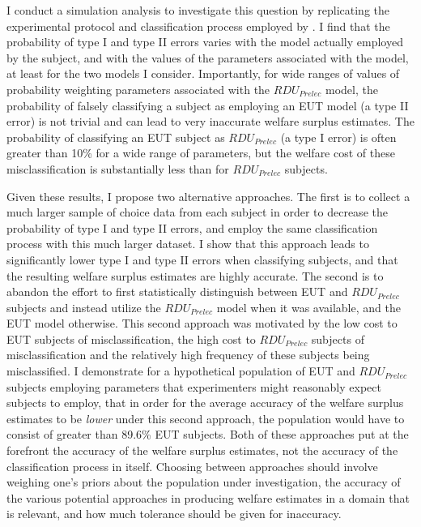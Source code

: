 \documentclass[../main.tex]{subfiles}
\begin{document}
I conduct a simulation analysis to investigate this question by replicating the experimental protocol and classification process employed by \textcite{Harrison2016}.
I find that the probability of type I and type II errors varies with the model actually employed by the subject, and with the values of the parameters associated with the model, at least for the two models I consider.
Importantly, for wide ranges of values of probability weighting parameters associated with the $\mathit{RDU_{Prelec}}$ model, the probability of falsely classifying a subject as employing an EUT model (a type II error) is not trivial and can lead to very inaccurate welfare surplus estimates.
The probability of classifying an EUT subject as $\mathit{RDU_{Prelec}}$ (a type I error) is often greater than 10\% for a wide range of parameters, but the welfare cost of these misclassification is substantially less than for $\mathit{RDU_{Prelec}}$ subjects.

Given these results, I propose two alternative approaches.
The first is to collect a much larger sample of choice data from each subject in order to decrease the probability of type I and type II errors, and employ the same classification process with this much larger dataset.
I show that this approach leads to significantly lower type I and type II errors when classifying subjects, and that the resulting welfare surplus estimates are highly accurate.
The second is to abandon the effort to first statistically distinguish between EUT and $\mathit{RDU_{Prelec}}$ subjects and instead utilize the $\mathit{RDU_{Prelec}}$ model when it was available, and the EUT model otherwise.
This second approach was motivated by the low cost to EUT subjects of misclassification, the high cost to $\mathit{RDU_{Prelec}}$ subjects of misclassification and the relatively high frequency of these subjects being misclassified.
I demonstrate for a hypothetical population of EUT and $\mathit{RDU_{Prelec}}$ subjects employing parameters that experimenters might reasonably expect subjects to employ, that in order for the average accuracy of the welfare surplus estimates to be \textit{lower} under this second approach, the population would have to consist of greater than 89.6\% EUT subjects.
Both of these approaches put at the forefront the accuracy of the welfare surplus estimates, not the accuracy of the classification process in itself.
Choosing between approaches should involve weighing one's priors about the population under investigation, the accuracy of the various potential approaches in producing welfare estimates in a domain that is relevant, and how much tolerance should be given for inaccuracy.
\end{document}
